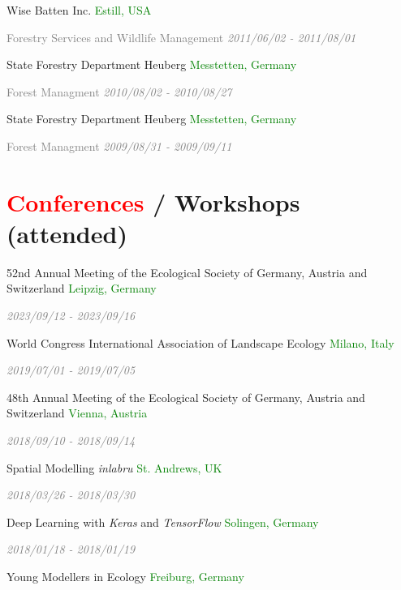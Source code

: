 \documentclass[hidelinks]{report}
\begin{document}
Wise Batten Inc.
\hfill
\textcolor{green}{Estill, USA}

\textcolor{grey}{\footnotesize{Forestry Services and Wildlife Management}}
\hfill
\textcolor{grey}{\textit{2011/06/02 - 2011/08/01}}

State Forestry Department Heuberg
\hfill
\textcolor{green}{Messtetten, Germany}

\textcolor{grey}{\footnotesize{Forest Managment}}
\hfill
\textcolor{grey}{\textit{2010/08/02 - 2010/08/27}}

State Forestry Department Heuberg
\hfill
\textcolor{green}{Messtetten, Germany}

\textcolor{grey}{\footnotesize{Forest Managment}}
\hfill
\textcolor{grey}{\textit{2009/08/31 - 2009/09/11}}



\section*{\textcolor{red}{Conferences} / Workshops \footnotesize{(attended)} \sout{\hfill}}


52nd Annual Meeting of the Ecological Society of Germany, Austria and Switzerland
\hfill
\textcolor{green}{Leipzig, Germany}

\hfill
\textcolor{grey}{\textit{2023/09/12 - 2023/09/16}}

World Congress International Association of Landscape Ecology
\hfill
\textcolor{green}{Milano, Italy}

\hfill
\textcolor{grey}{\textit{2019/07/01 - 2019/07/05}}

48th Annual Meeting of the Ecological Society of Germany, Austria and Switzerland
\hfill
\textcolor{green}{Vienna, Austria}

\hfill
\textcolor{grey}{\textit{2018/09/10 - 2018/09/14}}

Spatial Modelling \textit{inlabru}
\hfill
\textcolor{green}{St. Andrews, UK}

\hfill
\textcolor{grey}{\textit{2018/03/26 - 2018/03/30}}

Deep Learning with \textit{Keras} and \textit{TensorFlow}
\hfill
\textcolor{green}{Solingen, Germany}

\hfill
\textcolor{grey}{\textit{2018/01/18 - 2018/01/19}}

Young Modellers in Ecology
\hfill
\textcolor{green}{Freiburg, Germany}
\end{document}
